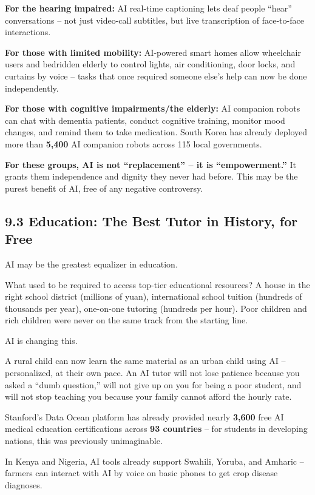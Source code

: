 \textbf{For the hearing impaired:} AI real-time captioning lets deaf
people ``hear'' conversations -- not just video-call subtitles, but live
transcription of face-to-face interactions.

\textbf{For those with limited mobility:} AI-powered smart homes allow
wheelchair users and bedridden elderly to control lights, air
conditioning, door locks, and curtains by voice -- tasks that once
required someone else's help can now be done independently.

\textbf{For those with cognitive impairments/the elderly:} AI companion
robots can chat with dementia patients, conduct cognitive training,
monitor mood changes, and remind them to take medication. South Korea
has already deployed more than \textbf{5,400} AI companion robots across
115 local governments.

\textbf{For these groups, AI is not ``replacement'' -- it is
``empowerment.''} It grants them independence and dignity they never had
before. This may be the purest benefit of AI, free of any negative
controversy.

\subsection{9.3 Education: The Best Tutor in History, for
Free}\label{education-the-best-tutor-in-history-for-free}

AI may be the greatest equalizer in education.

What used to be required to access top-tier educational resources? A
house in the right school district (millions of yuan), international
school tuition (hundreds of thousands per year), one-on-one tutoring
(hundreds per hour). Poor children and rich children were never on the
same track from the starting line.

AI is changing this.

A rural child can now learn the same material as an urban child using AI
-- personalized, at their own pace. An AI tutor will not lose patience
because you asked a ``dumb question,'' will not give up on you for being
a poor student, and will not stop teaching you because your family
cannot afford the hourly rate.

Stanford's Data Ocean platform has already provided nearly
\textbf{3,600} free AI medical education certifications across
\textbf{93 countries} -- for students in developing nations, this was
previously unimaginable.

In Kenya and Nigeria, AI tools already support Swahili, Yoruba, and
Amharic -- farmers can interact with AI by voice on basic phones to get
crop disease diagnoses.


